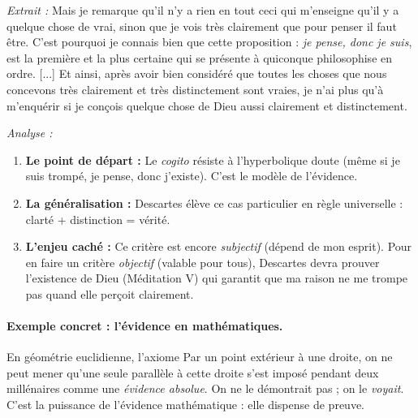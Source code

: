 \documentclass[11pt]{article}
\newcommand{\cle}[1]{{\popxbold\color{popdark}#1}}
\begin{document}
\begin{experience}
\emph{Extrait :} \guillemotleft Mais je remarque qu'il n'y a rien en tout ceci qui m'enseigne qu'il y a quelque chose de vrai, sinon que je vois très clairement que pour penser il faut être. C'est pourquoi je connais bien que cette proposition : \emph{je pense, donc je suis}, est la première et la plus certaine qui se présente à quiconque philosophise en ordre. [...] Et ainsi, après avoir bien considéré que toutes les choses que nous concevons très clairement et très distinctement sont vraies, je n'ai plus qu'à m'enquérir si je conçois quelque chose de Dieu aussi clairement et distinctement. \guillemotright

\emph{Analyse :}
\begin{enumerate}
    \item \textbf{Le point de départ :} Le \emph{cogito} résiste à l'hyperbolique doute (même si je suis trompé, je pense, donc j'existe). C'est le \cle{modèle} de l'évidence.
    \item \textbf{La généralisation :} Descartes élève ce cas particulier en \cle{règle universelle} : clarté + distinction = vérité.
    \item \textbf{L'enjeu caché :} Ce critère est encore \emph{subjectif} (dépend de mon esprit). Pour en faire un critère \emph{objectif} (valable pour tous), Descartes devra prouver l'existence de Dieu (Méditation V) qui garantit que ma raison ne me trompe pas quand elle perçoit clairement.
\end{enumerate}
\end{experience}

\paragraph{Exemple concret : l'évidence en mathématiques.}
En géométrie euclidienne, l'axiome \guillemotleft Par un point extérieur à une droite, on ne peut mener qu'une seule parallèle à cette droite \guillemotright s'est imposé pendant deux millénaires comme une \emph{évidence absolue}. On ne le démontrait pas ; on le \emph{voyait}. C'est la puissance de l'évidence mathématique : elle dispense de preuve.
\end{document}
